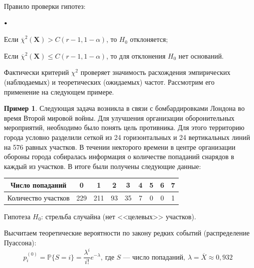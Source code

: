 \documentclass[oneside,final,14pt]{extreport}
\theoremstyle{plain}
\theoremstyle{definition}
\newtheorem*{exmp}{Пример}
\theoremstyle{named}
\newcommand\sbullet[1][.5]{\mathbin{\vcenter{\hbox{\scalebox{#1}{$\bullet$}}}}}
\newenvironment{compactlist}{
\begin{list}{{$\sbullet[.75]$}}{
\setlength\partopsep{0pt}
\setlength\parskip{0pt}
\setlength\parsep{0pt}
\setlength\topsep{0pt}
\setlength\itemsep{0pt}
}
}{
\end{list}
}
\begin{document}
Правило проверки гипотез:
\begin{compactlist}
    \item Если $\overline{\chi}^{2} \left(\mathbf{X}\right)>C(r-1,1-\alpha)$, то $H_0$ отклоняется;
    \item Если $\overline{\chi}^{2} \left(\mathbf{X}\right) \leqslant C(r-1,1-\alpha)$, то для отклонения $H_0$ нет оснований.
\end{compactlist}
\medskip
\begin{center}
\end{center}

Фактически критерий $\chi^{2}$ проверяет значимость расхождения эмпирических (наблюдаемых) и теоретических (ожидаемых) частот. Рассмотрим его применение на следующем примере.
\begin{exmp}
Следующая задача возникла в связи с бомбардировками Лондона во время Второй мировой войны. Для улучшения организации оборонительных мероприятий, необходимо было понять цель противника. Для этого территорию города условно разделили сеткой из 24 горизонтальных и 24 вертикальных линий на 576 равных участков. В течении некторого времени в центре организации обороны города собиралась информация о количестве попаданий снарядов в каждый из участков. В итоге были получены следующие данные:
\begin{center}
    \begin{tabular}{|c|c|c|c|c|c|c|c|c|}
    \hline Число попаданий & 0 & 1 & 2 & 3 & 4 & 5 & 6 & 7 \\
    \hline Количество участков & 229 & 211 & 93 & 35 & 7 & 0 & 0 & 1 \\
    \hline
    \end{tabular}
\end{center}

Гипотеза $H_0$: стрельба случайна (нет <<целевых>> участков).

Высчитаем теоретические вероятности по закону редких событий (распределение Пуассона):
\begin{equation*}
    p_i^{(0)} = \mathbb{P}\{S=i\}=\frac{\lambda^{i}}{i !} e^{-\lambda}, ~\text{где $S$~--- число попаданий},~ \lambda = \overline{X} \approx 0,932
\end{equation*}
\end{exmp}
\end{document}
